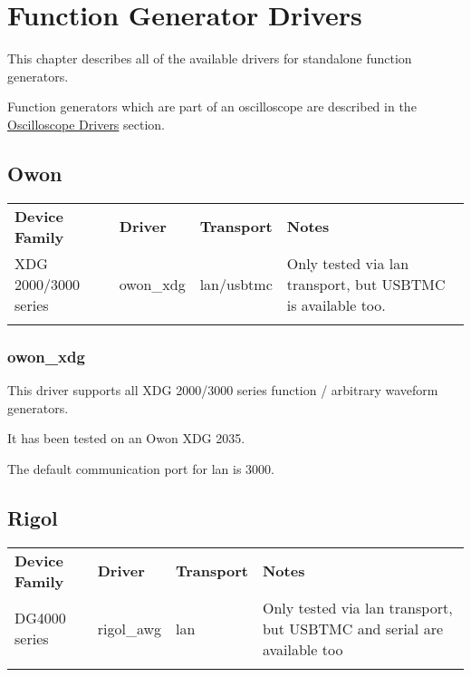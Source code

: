 \chapter{Function Generator Drivers}
\label{sec:funcgen-drivers}

This chapter describes all of the available drivers for standalone function generators.

Function generators which are part of an oscilloscope are described in the \hyperref[sec:scope-drivers]{Oscilloscope
Drivers} section.


\section{Owon}

\begin{tabularx}{16cm}{lllX}
\thickhline
\textbf{Device Family} & \textbf{Driver} & \textbf{Transport} & \textbf{Notes} \\
\thickhline
XDG 2000/3000 series & owon\_xdg & lan/usbtmc & Only tested via lan transport, but USBTMC is available too.\\
\thickhline
\end{tabularx}

\subsection{owon\_xdg}

This driver supports all XDG 2000/3000 series function / arbitrary waveform generators.

It has been tested on an Owon XDG 2035.

The default communication port for lan is 3000.


\section{Rigol}

\begin{tabularx}{16cm}{lllX}
\thickhline
\textbf{Device Family} & \textbf{Driver} & \textbf{Transport} & \textbf{Notes} \\
\thickhline
DG4000 series & rigol\_awg & lan & Only tested via lan transport, but USBTMC and serial are available too\\
\thickhline
\end{tabularx}

